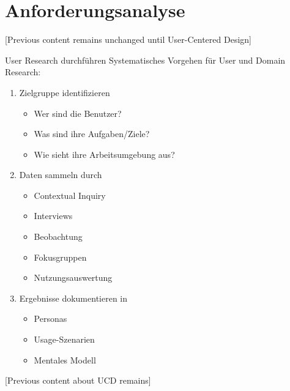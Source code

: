 \section{Anforderungsanalyse}

[Previous content remains unchanged until User-Centered Design]

\begin{KR}{User Research durchführen}
Systematisches Vorgehen für User und Domain Research:
\begin{enumerate}
    \item Zielgruppe identifizieren
    \begin{itemize}
        \item Wer sind die Benutzer?
        \item Was sind ihre Aufgaben/Ziele?
        \item Wie sieht ihre Arbeitsumgebung aus?
    \end{itemize}
    \item Daten sammeln durch
    \begin{itemize}
        \item Contextual Inquiry
        \item Interviews
        \item Beobachtung
        \item Fokusgruppen
        \item Nutzungsauswertung
    \end{itemize}
    \item Ergebnisse dokumentieren in
    \begin{itemize}
        \item Personas
        \item Usage-Szenarien
        \item Mentales Modell
    \end{itemize}
\end{enumerate}
\end{KR}

[Previous content about UCD remains]


